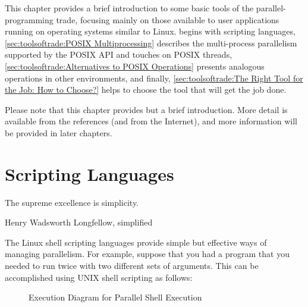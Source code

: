 
%

This chapter provides a brief introduction to some basic tools of the
parallel-programming trade, focusing mainly on those available to
user applications running on operating systems similar to Linux.
 begins with
scripting languages,
\cref{sec:toolsoftrade:POSIX Multiprocessing}
describes the multi-process parallelism supported by the POSIX API and
touches on POSIX threads,
\cref{sec:toolsoftrade:Alternatives to POSIX Operations}
presents analogous operations in other environments, and finally,
\cref{sec:toolsoftrade:The Right Tool for the Job: How to Choose?}
helps to choose the tool that will get the job done.

\QuickQuizEnd

Please note that this chapter provides but a brief introduction.
More detail is available from the references (and from the Internet),
and more information will be provided in later chapters.

\section{Scripting Languages}
\label{sec:toolsoftrade:Scripting Languages}
%
\epigraph{The supreme excellence is simplicity.}
	 {Henry Wadsworth Longfellow, simplified}

The Linux shell scripting languages provide simple but effective ways
of managing parallelism.
For example, suppose that you had a program 
that you needed to run twice with two different sets of arguments.
This can be accomplished using UNIX shell scripting as follows:



\begin{figure}
\centering
{}
\caption{Execution Diagram for Parallel Shell Execution}
\label{fig:toolsoftrade:Execution Diagram for Parallel Shell Execution}
\end{figure}

